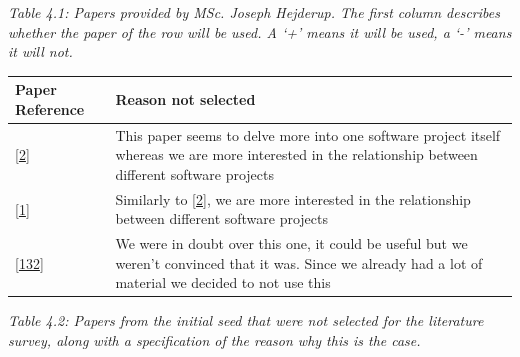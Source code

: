 \documentclass[]{book}
\begin{document}
\emph{Table 4.1: Papers provided by MSc. Joseph Hejderup. The first
column describes whether the paper of the row will be used. A `+' means
it will be used, a `-' means it will not.}

\begin{longtable}[]{@{}ll@{}}
\toprule
\begin{minipage}[b]{0.05\columnwidth}\raggedright\strut
Paper Reference\strut
\end{minipage} & \begin{minipage}[b]{0.05\columnwidth}\raggedright\strut
Reason not selected\strut
\end{minipage}\tabularnewline
\midrule
\endhead
\begin{minipage}[t]{0.05\columnwidth}\raggedright\strut
{[}\protect\hyperlink{ref-Abate2009}{2}{]}\strut
\end{minipage} & \begin{minipage}[t]{0.05\columnwidth}\raggedright\strut
This paper seems to delve more into one software project itself whereas
we are more interested in the relationship between different software
projects\strut
\end{minipage}\tabularnewline
\begin{minipage}[t]{0.05\columnwidth}\raggedright\strut
{[}\protect\hyperlink{ref-Abate2011}{1}{]}\strut
\end{minipage} & \begin{minipage}[t]{0.05\columnwidth}\raggedright\strut
Similarly to {[}\protect\hyperlink{ref-Abate2009}{2}{]}, we are more
interested in the relationship between different software projects\strut
\end{minipage}\tabularnewline
\begin{minipage}[t]{0.05\columnwidth}\raggedright\strut
{[}\protect\hyperlink{ref-Mens2013}{132}{]}\strut
\end{minipage} & \begin{minipage}[t]{0.05\columnwidth}\raggedright\strut
We were in doubt over this one, it could be useful but we weren't
convinced that it was. Since we already had a lot of material we decided
to not use this\strut
\end{minipage}\tabularnewline
\bottomrule
\end{longtable}

\emph{Table 4.2: Papers from the initial seed that were not selected for
the literature survey, along with a specification of the reason why this
is the case.}
\end{document}
